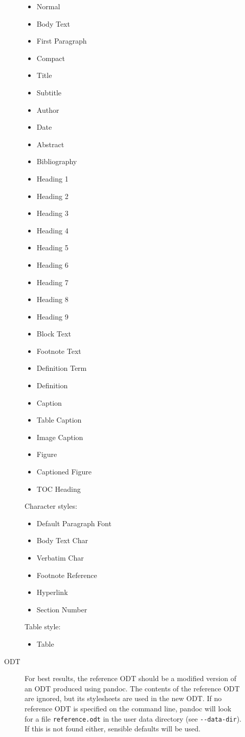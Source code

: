 \documentclass[]{article}
\providecommand{\tightlist}{%
  \setlength{\itemsep}{0pt}\setlength{\parskip}{0pt}}
\begin{document}
\begin{description}
\begin{description}
\begin{itemize}
\tightlist
\item
  Normal
\item
  Body Text
\item
  First Paragraph
\item
  Compact
\item
  Title
\item
  Subtitle
\item
  Author
\item
  Date
\item
  Abstract
\item
  Bibliography
\item
  Heading 1
\item
  Heading 2
\item
  Heading 3
\item
  Heading 4
\item
  Heading 5
\item
  Heading 6
\item
  Heading 7
\item
  Heading 8
\item
  Heading 9
\item
  Block Text
\item
  Footnote Text
\item
  Definition Term
\item
  Definition
\item
  Caption
\item
  Table Caption
\item
  Image Caption
\item
  Figure
\item
  Captioned Figure
\item
  TOC Heading
\end{itemize}

Character styles:

\begin{itemize}
\tightlist
\item
  Default Paragraph Font
\item
  Body Text Char
\item
  Verbatim Char
\item
  Footnote Reference
\item
  Hyperlink
\item
  Section Number
\end{itemize}

Table style:

\begin{itemize}
\tightlist
\item
  Table
\end{itemize}
\item[ODT]
For best results, the reference ODT should be a modified version of an
ODT produced using pandoc. The contents of the reference ODT are
ignored, but its stylesheets are used in the new ODT. If no reference
ODT is specified on the command line, pandoc will look for a file
\texttt{reference.odt} in the user data directory (see
\texttt{-\/-data-dir}). If this is not found either, sensible defaults
will be used.


\end{description}
\end{description}
\end{document}
